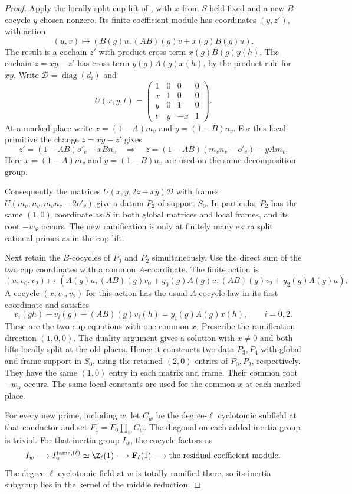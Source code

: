\begin{proof}
Apply the locally split cup lift of
\cite{count-two-cohomology}, with \(x\)
from \(S\) held fixed and a new \(B\)-cocycle \(y\)
chosen nonzero. Its finite coefficient module has
coordinates \((y,z')\), with action
\[
   (u,v)\longmapsto (B(g)u,(AB)(g)v+x(g)B(g)u).
\]
The result is a cochain \(z'\) with product
cross term \(x(g)B(g)y(h)\).
The cochain \(z=xy-z'\) has cross term
\(y(g)A(g)x(h)\), by the product rule for \(xy\).
Write \(\mathcal D=\operatorname{diag}(d_i)\) and
\[
 U(x,y,t)=
 \begin{pmatrix}
 1&0&0&0\\ x&1&0&0\\ y&0&1&0\\ t&y&-x&1
 \end{pmatrix}.
\]
At a marked place write \(x=(1-A)m_v\) and
\(y=(1-B)n_v\). For this local primitive the change \(z=xy-z'\) gives
\[
  z'=(1-AB)o'_v-xBn_v
     \quad\Longrightarrow\quad
  z=(1-AB)(m_vn_v-o'_v)-yAm_v .
\]
Here \(x=(1-A)m_v\) and \(y=(1-B)n_v\) are used on the same
decomposition group.

Consequently the matrices \(U(x,y,2z-xy)\mathcal D\)
with frames \(U(m_v,n_v,m_vn_v-2o'_v)\)
give a datum \(P_2\) of support \(S_0\).
In particular \(P_2\) has the
same \((1,0)\) coordinate as \(S\) in both global
matrices and local frames, and its root
\(-w_\Psi\) occurs. The new ramification is only
at finitely many extra split rational primes as
in the cup lift.

Next retain the \(B\)-cocycles of \(P_0\) and
\(P_2\) simultaneously. Use the direct sum of
the two cup coordinates with a common \(A\)-coordinate.
The finite action is
\[
 (u,v_0,v_2)\longmapsto
  (A(g)u,(AB)(g)v_0+y_0(g)A(g)u,
           (AB)(g)v_2+y_2(g)A(g)u).
\]
A cocycle \((x,v_0,v_2)\) for this action has the usual
\(A\)-cocycle law in its first coordinate and satisfies
\[
 v_i(gh)-v_i(g)-(AB)(g)v_i(h)=y_i(g)A(g)x(h),
                                  \qquad i=0,2 .
\]
These are the two cup equations with one common \(x\).
Prescribe the ramification direction \((1,0,0)\).
The duality argument gives a solution with \(x\ne0\)
and both lifts locally split at the old places. Hence it constructs two data \(P_3,P_4\)
with global and frame support in \(S_0\), using the
retained \((2,0)\) entries of \(P_0,P_2\),
respectively. They have the same \((1,0)\) entry in
each matrix and frame. Their common root
\(-w_\alpha\) occurs. The same local constants
are used for the common \(x\) at each marked place.

For every new prime, including \(w\), let \(C_w\) be
the degree-\(\ell\) cyclotomic subfield at that conductor
and set \(F_1=F_0\prod_w C_w\). The diagonal on each added
inertia group is trivial. For that inertia group \(I_w\), the cocycle factors as
\[
 I_w\longrightarrow I_w^{\rm tame,(\ell)}
 \simeq\Z_\ell(1)\longrightarrow\mathbf F_\ell(1)
 \longrightarrow \text{the residual coefficient module}.
\]
The degree-\(\ell\) cyclotomic field at \(w\) is totally ramified there, so its inertia subgroup lies in the kernel of the middle reduction.


\end{proof}
